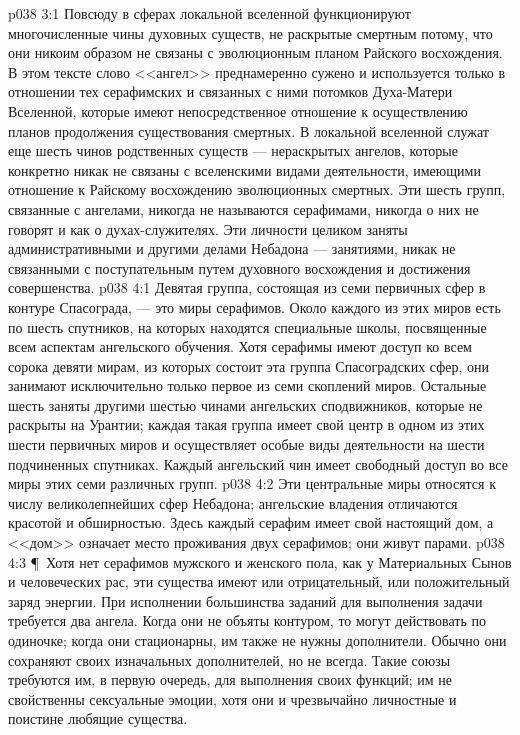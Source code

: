 \vs p038 3:1 Повсюду в сферах локальной вселенной функционируют многочисленные чины духовных существ, не раскрытые смертным потому, что они никоим образом не связаны с эволюционным планом Райского восхождения. В этом тексте слово <<ангел>> преднамеренно сужено и используется только в отношении тех серафимских и связанных с ними потомков Духа\hyp{}Матери Вселенной, которые имеют непосредственное отношение к осуществлению планов продолжения существования смертных. В локальной вселенной служат еще шесть чинов родственных существ --- нераскрытых ангелов, которые конкретно никак не связаны с вселенскими видами деятельности, имеющими отношение к Райскому восхождению эволюционных смертных. Эти шесть групп, связанные с ангелами, никогда не называются серафимами, никогда о них не говорят и как о духах\hyp{}служителях. Эти личности целиком заняты административными и другими делами Небадона --- занятиями, никак не связанными с поступательным путем духовного восхождения и достижения совершенства.
\vs p038 4:1 Девятая группа, состоящая из семи первичных сфер в контуре Спасограда, --- это миры серафимов. Около каждого из этих миров есть по шесть спутников, на которых находятся специальные школы, посвященные всем аспектам ангельского обучения. Хотя серафимы имеют доступ ко всем сорока девяти мирам, из которых состоит эта группа Спасоградских сфер, они занимают исключительно только первое из семи скоплений миров. Остальные шесть заняты другими шестью чинами ангельских сподвижников, которые не раскрыты на Урантии; каждая такая группа имеет свой центр в одном из этих шести первичных миров и осуществляет особые виды деятельности на шести подчиненных спутниках. Каждый ангельский чин имеет свободный доступ во все миры этих семи различных групп.
\vs p038 4:2 Эти центральные миры относятся к числу великолепнейших сфер Небадона; ангельские владения отличаются красотой и обширностью. Здесь каждый серафим имеет свой настоящий дом, а <<дом>> означает место проживания двух серафимов; они живут парами.
\vs p038 4:3 \P\ Хотя нет серафимов мужского и женского пола, как у Материальных Сынов и человеческих рас, эти существа имеют или отрицательный, или положительный заряд энергии. При исполнении большинства заданий для выполнения задачи требуется два ангела. Когда они не объяты контуром, то могут действовать по одиночке; когда они стационарны, им также не нужны дополнители. Обычно они сохраняют своих изначальных дополнителей, но не всегда. Такие союзы требуются им, в первую очередь, для выполнения своих функций; им не свойственны сексуальные эмоции, хотя они и чрезвычайно личностные и поистине любящие существа.
